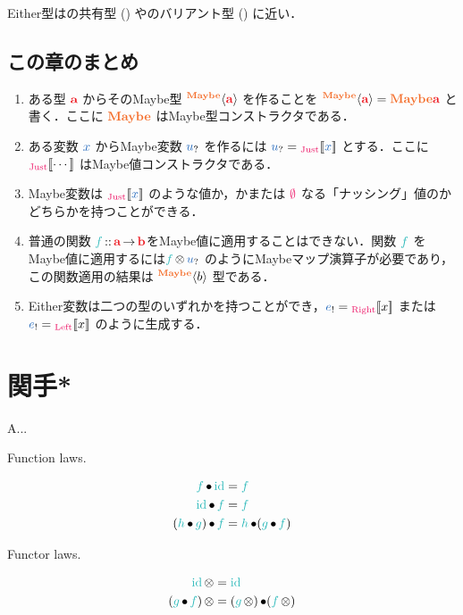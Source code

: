 \documentclass[a5paper,twoside,fleqn,draft]{jsbook}
\begin{document}
Either型は\clang の共有型 () や\cxx のバリアント型 () に近い．

\section{この章のまとめ}

\begin{enumerate}
\item ある型 $\hTypeName{a}$ からそのMaybe型 $\hMaybeConstruct{\hTypeName{a}}$ を作ることを $\hMaybeConstruct{\hTypeName{a}}=\hMaybe\hTypeName{a} $ と書く．ここに $\hMaybe$ はMaybe型コンストラクタである．
\item ある変数 $\hVar{x}$ からMaybe変数 $\hMaybeVar{u}$ を作るには $\hMaybeVar{u}=\hJustWith{\hVar{x}}$ とする．ここに $\hJustWith{\dotsb}$ はMaybe値コンストラクタである．
\item Maybe変数は $\hJustWith{\hVar{x}}$ のような値か，かまたは $\hNothing$ なる「ナッシング」値のかどちらかを持つことができる．
\item 普通の関数 $\hFunc{f}\hIsTypeOf\mProjEXP{\hTypeName{a} }{\hTypeName{b} }$をMaybe値に適用することはできない．関数 $\hFunc{f}$ をMaybe値に適用するには$\hFunc{f}\hMaybeMap\hMaybeVar{u}$ のようにMaybeマップ演算子が必要であり，この関数適用の結果は $\hMaybeConstruct{b}$ 型である．
\item Either変数は二つの型のいずれかを持つことができ，$\hEitherVar{e}=\hRightWith{x}$ または$\hEitherVar{e}=\hLeftWith{x}$ のように生成する．
\end{enumerate}

\chapter{関手*}
\label{ch:functor}

\begin{leader}
A...
\end{leader}


Function laws.

\begin{align}
\hFunc{f}\hCompose\hId&=\hFunc{f}\\
\hId\hCompose\hFunc{f}&=\hFunc{f}\\
(\hFunc{h}\hCompose\hFunc{g})\hCompose\hFunc{f}&=\hFunc{h}\hCompose(\hFunc{g}\hCompose\hFunc{f})
\end{align}

Functor laws.

\begin{align}
\hId\hFunctorMap&=\hId\\
(\hFunc{g}\hCompose\hFunc{f})\hFunctorMap&=(\hFunc{g}\hFunctorMap)\hCompose(\hFunc{f}\hFunctorMap)
\end{align}
\end{document}

